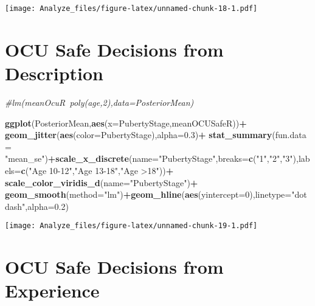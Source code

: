 \documentclass[]{article}
\newenvironment{Shaded}{\begin{snugshade}}{\end{snugshade}}
\newcommand{\KeywordTok}[1]{\textcolor[rgb]{0.13,0.29,0.53}{\textbf{#1}}}
\newcommand{\DataTypeTok}[1]{\textcolor[rgb]{0.13,0.29,0.53}{#1}}
\newcommand{\DecValTok}[1]{\textcolor[rgb]{0.00,0.00,0.81}{#1}}
\newcommand{\FloatTok}[1]{\textcolor[rgb]{0.00,0.00,0.81}{#1}}
\newcommand{\StringTok}[1]{\textcolor[rgb]{0.31,0.60,0.02}{#1}}
\newcommand{\CommentTok}[1]{\textcolor[rgb]{0.56,0.35,0.01}{\textit{#1}}}
\newcommand{\OperatorTok}[1]{\textcolor[rgb]{0.81,0.36,0.00}{\textbf{#1}}}
\newcommand{\NormalTok}[1]{#1}
\begin{document}
\texttt{[image: Analyze\_files/figure-latex/unnamed-chunk-18-1.pdf]}

\section{OCU Safe Decisions from
Description}\label{ocu-safe-decisions-from-description}

\begin{Shaded}
\begin{Highlighting}[]
\CommentTok{#lm(meanOcuR~poly(age,2),data=PosteriorMean)}

\KeywordTok{ggplot}\NormalTok{(PosteriorMean,}\KeywordTok{aes}\NormalTok{(}\DataTypeTok{x=}\NormalTok{PubertyStage,meanOCUSafeR))}\OperatorTok{+}
\StringTok{  }\KeywordTok{geom_jitter}\NormalTok{(}\KeywordTok{aes}\NormalTok{(}\DataTypeTok{color=}\NormalTok{PubertyStage),}\DataTypeTok{alpha=}\FloatTok{0.3}\NormalTok{)}\OperatorTok{+}
\StringTok{  }\KeywordTok{stat_summary}\NormalTok{(}\DataTypeTok{fun.data =} \StringTok{"mean_se"}\NormalTok{)}\OperatorTok{+}\KeywordTok{scale_x_discrete}\NormalTok{(}\DataTypeTok{name=}\StringTok{"PubertyStage"}\NormalTok{,}\DataTypeTok{breaks=}\KeywordTok{c}\NormalTok{(}\StringTok{"1"}\NormalTok{,}\StringTok{"2"}\NormalTok{,}\StringTok{"3"}\NormalTok{),}\DataTypeTok{labels=}\KeywordTok{c}\NormalTok{(}\StringTok{"Age 10-12"}\NormalTok{,}\StringTok{"Age 13-18"}\NormalTok{,}\StringTok{"Age >18"}\NormalTok{))}\OperatorTok{+}
\StringTok{  }\KeywordTok{scale_color_viridis_d}\NormalTok{(}\DataTypeTok{name=}\StringTok{"PubertyStage"}\NormalTok{)}\OperatorTok{+}
\StringTok{  }\KeywordTok{geom_smooth}\NormalTok{(}\DataTypeTok{method=}\StringTok{"lm"}\NormalTok{)}\OperatorTok{+}\KeywordTok{geom_hline}\NormalTok{(}\KeywordTok{aes}\NormalTok{(}\DataTypeTok{yintercept=}\DecValTok{0}\NormalTok{),}\DataTypeTok{linetype=}\StringTok{"dotdash"}\NormalTok{,}\DataTypeTok{alpha=}\FloatTok{0.2}\NormalTok{)}
\end{Highlighting}
\end{Shaded}

\texttt{[image: Analyze\_files/figure-latex/unnamed-chunk-19-1.pdf]}

\section{OCU Safe Decisions from
Experience}\label{ocu-safe-decisions-from-experience}
\end{document}
